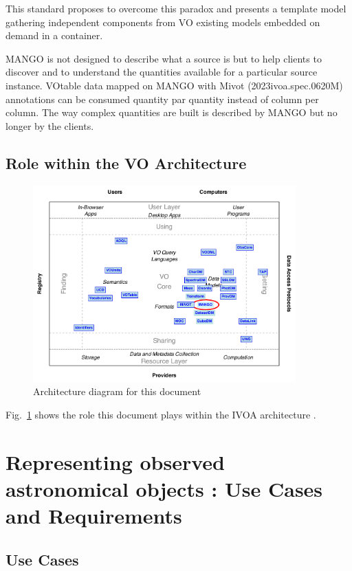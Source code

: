 \documentclass[11pt,a4paper]{ivoa}
\begin{document}
This standard proposes to overcome this paradox and presents a template model gathering independent
components from VO existing models embedded on demand in a container.

MANGO is not designed to describe what a source is but to help clients to discover and to understand
the quantities available for a particular source instance.
VOtable data mapped on MANGO with Mivot (2023ivoa.spec.0620M) annotations can be consumed quantity 
par quantity instead of column per column.
The way complex quantities are built is  described by MANGO but no longer by the clients.

\subsection{Role within the VO Architecture}

\begin{figure}
\centering

\includegraphics[width=0.9\textwidth]{role_diagram.pdf}
\caption{Architecture diagram for this document}
\label{fig:archdiag}
\end{figure}

Fig.~\ref{fig:archdiag} shows the role this document plays within the
IVOA architecture \citep{2010ivoa.rept.1123A}.


\section{Representing observed astronomical objects : Use Cases and  Requirements}

\subsection{Use Cases}
\end{document}

